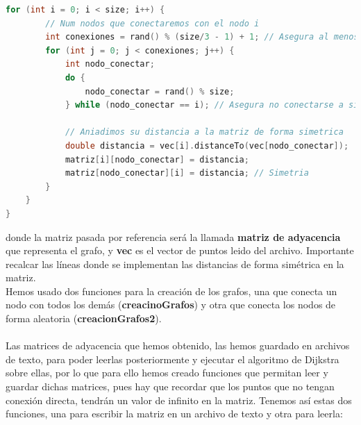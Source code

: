 \documentclass[11pt,openany]{book}
\begin{document}
\begin{lstlisting}[language=C++]
    for (int i = 0; i < size; i++) {
        // Num nodos que conectaremos con el nodo i
        int conexiones = rand() % (size/3 - 1) + 1; // Asegura al menos una conexion por nodo
        for (int j = 0; j < conexiones; j++) {
            int nodo_conectar;
            do {
                nodo_conectar = rand() % size;
            } while (nodo_conectar == i); // Asegura no conectarse a si mismo

            // Aniadimos su distancia a la matriz de forma simetrica
            double distancia = vec[i].distanceTo(vec[nodo_conectar]);
            matriz[i][nodo_conectar] = distancia;
            matriz[nodo_conectar][i] = distancia; // Simetria
        }
    }
}
\end{lstlisting}
donde la matriz pasada por referencia será la llamada \textbf{matriz de adyacencia} que representa el grafo, y \textbf{vec} es el vector de puntos
leido del archivo. Importante recalcar las líneas donde se implementan las distancias de forma simétrica en la matriz.\\ 
Hemos usado dos funciones para la creación de los grafos, una que conecta un nodo con todos los demás (\textbf{creacinoGrafos}) y otra que conecta los nodos de forma aleatoria 
(\textbf{creacionGrafos2}).\\ \\
Las matrices de adyacencia que hemos obtenido, las hemos guardado en archivos de texto, para poder leerlas posteriormente y ejecutar
el algoritmo de Dijkstra sobre ellas, por lo que para ello hemos creado funciones que permitan leer y guardar dichas matrices, pues hay que recordar que 
los puntos que no tengan conexión directa, tendrán un valor de infinito en la matriz. Tenemos así estas dos funciones, una para 
escribir la matriz en un archivo de texto y otra para leerla:
\end{document}
